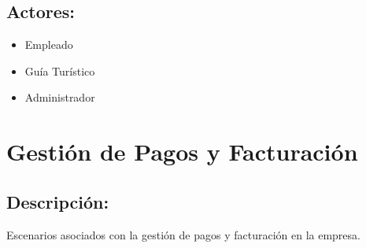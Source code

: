 \subsection*{Actores:}
\begin{itemize}
    \item Empleado
    \item Guía Tur\'istico
    \item Administrador 
\end{itemize}





\section{Gesti\'on de Pagos y Facturaci\'on}

\subsection*{Descripci\'on:}
Escenarios asociados con la gesti\'on de pagos y facturaci\'on en la empresa.

